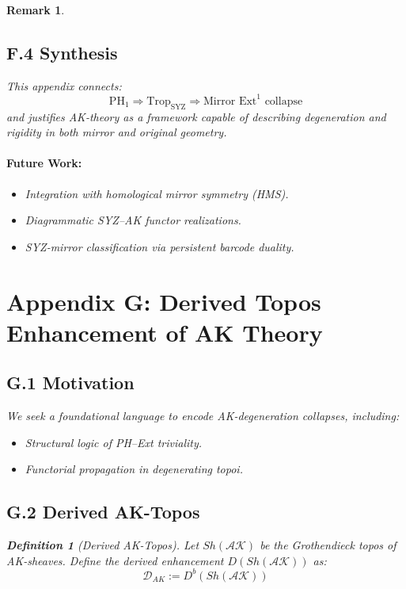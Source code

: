 \documentclass[11pt]{article}
\newtheorem{definition}[theorem]{Definition}
\newtheorem{remark}[theorem]{Remark}
\begin{document}
\begin{remark}
\subsection*{F.4 Synthesis}

This appendix connects:
\[
\mathrm{PH}_1 \Rightarrow \mathrm{Trop}_{\mathrm{SYZ}} \Rightarrow \text{Mirror } \mathrm{Ext}^1 \text{ collapse}
\]
and justifies AK-theory as a framework capable of describing degeneration and rigidity in both mirror and original geometry.

\paragraph{Future Work:}
\begin{itemize}
  \item Integration with homological mirror symmetry (HMS).
  \item Diagrammatic SYZ–AK functor realizations.
  \item SYZ-mirror classification via persistent barcode duality.
\end{itemize}


\section*{Appendix G: Derived Topos Enhancement of AK Theory}

\subsection*{G.1 Motivation}
We seek a foundational language to encode AK-degeneration collapses, including:
\begin{itemize}
  \item Structural logic of PH–Ext triviality.
  \item Functorial propagation in degenerating topoi.
\end{itemize}

\subsection*{G.2 Derived AK-Topos}

\begin{definition}[Derived AK-Topos]
Let $Sh(\mathcal{AK})$ be the Grothendieck topos of AK-sheaves.  
Define the derived enhancement $D(Sh(\mathcal{AK}))$ as:
\[
\mathcal{D}_{AK} := D^b(Sh(\mathcal{AK}))
\]
\end{definition}


\end{remark}
\end{document}
